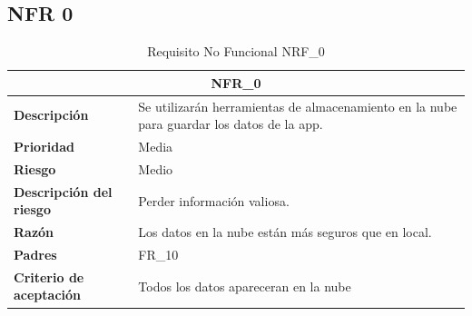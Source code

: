 \documentclass{scrreprt}
\begin{document}
\subsection{NFR 0}
\begin{table}[H]
    \label{tab:my-table}
    \begin{tabular}{|p{5cm}|p{11cm}|}
    \hline
    \multicolumn{2}{|c|}{\textbf{NFR_0}} \\
    \hline
    \textbf{Descripción  }                      &  Se utilizarán herramientas de almacenamiento en la nube para guardar los datos de la app.                                                                            \\ \hline
    \textbf{Prioridad}                          & Media                                                                                              \\ \hline
    \textbf{Riesgo}                          & Medio                                                                                                \\ \hline
    \textbf{Descripción del riesgo}                    & Perder información valiosa.                                                                               \\ \hline
    \textbf{Razón}                   & Los datos en la nube están más seguros que en local.                                                                                               \\ \hline
    \textbf{Padres}                               &  FR_10\\  \hline
     \textbf{Criterio de aceptación}                    & Todos los datos apareceran en la nube  \\ \hline
    \end{tabular}%
    
    \caption{Requisito No Funcional NRF_0}
\end{table}
\end{document}
